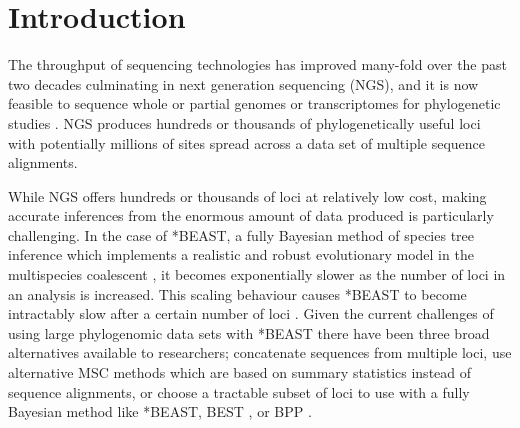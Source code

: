 \documentclass[nogrid]{MBE}%
\begin{document}

\maketitle
\clearpage

\section{Introduction}

The throughput of sequencing technologies has improved many-fold over the past
two decades culminating in next generation sequencing (NGS), and it is now
feasible to sequence whole or partial genomes or transcriptomes for phylogenetic
studies \citep{annurev-ecolsys-110512-135822}. NGS produces hundreds or
thousands of phylogenetically useful loci \citep[see for example][]{Blom20160181}
with potentially millions of sites spread across a data set of multiple
sequence alignments.

While NGS offers hundreds or thousands of loci at relatively low cost, making
accurate inferences from the enormous amount of data produced is particularly
challenging. In the case of *BEAST, a fully Bayesian method of species tree
inference which implements a realistic and robust evolutionary model in the
multispecies coalescent \citep[MSC;][]{Degnan2009332, Heled01032010}, it becomes exponentially
slower as the number of loci in an analysis is increased. This scaling behaviour
causes *BEAST to become intractably slow after a certain number of loci
\citep[the exact number will depend on other parameters of the data set, see][]{Ogilvie01052016}.
Given the current challenges of using large phylogenomic data sets with *BEAST
there have been three broad alternatives available to researchers; concatenate
sequences from multiple loci, use alternative MSC methods which are based on
summary statistics instead of sequence alignments, or choose a tractable
subset of loci to use with a fully Bayesian method like *BEAST, BEST \citep{Liu01112008}, or BPP
\citep{Yang854}.
\end{document}
